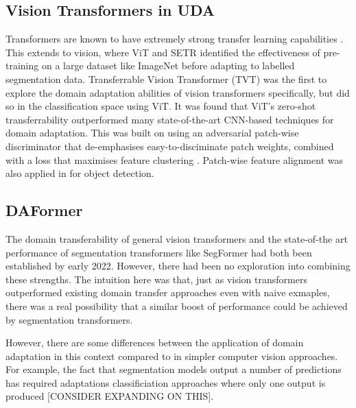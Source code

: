 \documentclass[a4paper,12pt]{report}
\begin{document}
\subsection*{Vision Transformers in UDA}

Transformers are known to have extremely strong transfer learning capabilities \cite{radford_language_2019} \cite{wright_transformer_2020}. This extends to vision, where ViT \cite{dosovitskiy_image_2021} and SETR \cite{zheng_rethinking_2021} identified the effectiveness of pre-training on a large dataset like ImageNet before adapting to labelled segmentation data. Transferrable Vision Transformer (TVT) \cite{yang_tvt_2021} was the first to explore the domain adaptation abilities of vision transformers specifically, but did so in the classification space using ViT. It was found that ViT's zero-shot transferrability outperformed many state-of-the-art CNN-based techniques for domain adaptation. This was built on using an adversarial patch-wise discriminator that de-emphasises easy-to-disciminate patch weights, combined with a loss that maximises feature clustering \cite{chapelle_semi-supervised_2005}. Patch-wise feature alignment was also applied in \cite{wang_exploring_2021} for object detection.

\subsection*{DAFormer}

The domain transferability of general vision transformers and the state-of-the art performance of segmentation transformers like SegFormer had both been established by early 2022. However, there had been no exploration into combining these strengths.
The intuition here was that, just as vision transformers outperformed existing domain transfer approaches even with naive exmaples, there was a real possibility that a similar boost of performance could be achieved by segmentation transformers.

However, there are some differences between the application of domain adaptation in this context compared to in simpler computer vision approaches. For example, the fact that segmentation models output a number of predictions has required adaptations classificiation approaches where only one output is produced [CONSIDER EXPANDING ON THIS].
\end{document}
